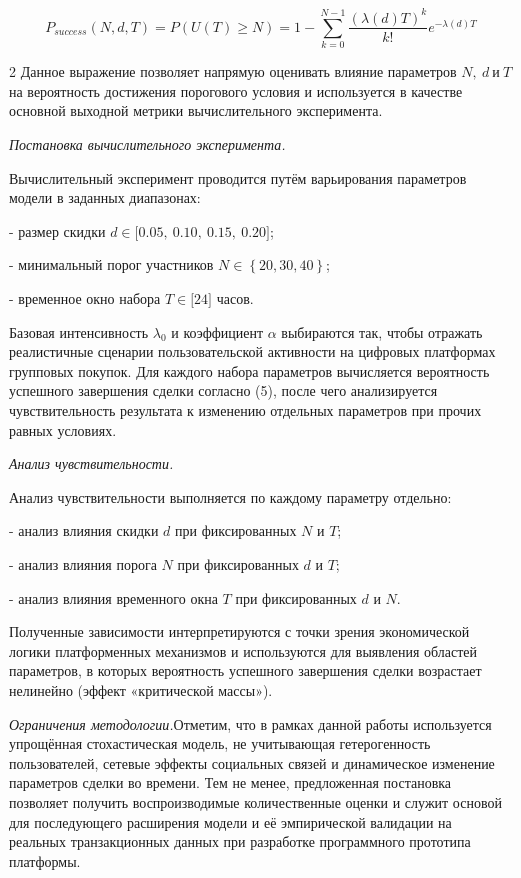 \vspace{-1.5em}
\begin{equation}
P_{success}(N,d,T) = P\left( U(T) \geq N \right) = 1 - \sum_{k = 0}^{N - 1}{\frac{{(\lambda(d)T)}^{k}}{k!}e^{- \lambda(d)T}}
\end{equation}
\vspace{-1.5em}
\begin{multicols}{2}
Данное выражение позволяет напрямую оценивать влияние параметров
\(N,\ d\ и\ T\) на вероятность достижения порогового условия и
используется в качестве основной выходной метрики вычислительного
эксперимента.

\emph{Постановка вычислительного эксперимента.}

Вычислительный эксперимент проводится путём варьирования параметров
модели в заданных диапазонах:

- размер скидки \(d \in \lbrack 0.05,\ 0.10,\ 0.15,\ 0.20\rbrack\);

- минимальный порог участников \(N \in \left\{ 20,30,40 \right\}\);

- временное окно набора \(T \in \lbrack 24\rbrack\) часов.

Базовая интенсивность \(\lambda_{0}\) и коэффициент \(\alpha\)
выбираются так, чтобы отражать реалистичные сценарии пользовательской
активности на цифровых платформах групповых покупок. Для каждого набора
параметров вычисляется вероятность успешного завершения сделки согласно
(5), после чего анализируется чувствительность результата к изменению
отдельных параметров при прочих равных условиях.

\emph{Анализ чувствительности.}

Анализ чувствительности выполняется по каждому параметру отдельно:

- анализ влияния скидки \(d\) при фиксированных \(N\) и \(T\);

- анализ влияния порога \(N\) при фиксированных \(d\) и \(T\);

- анализ влияния временного окна \(T\) при фиксированных \(d\) и \(N\).

Полученные зависимости интерпретируются с точки зрения экономической
логики платформенных механизмов и используются для выявления областей
параметров, в которых вероятность успешного завершения сделки возрастает
нелинейно (эффект «критической массы»).

\emph{Ограничения методологии.}Отметим, что в рамках данной работы
используется упрощённая стохастическая модель, не учитывающая
гетерогенность пользователей, сетевые эффекты социальных связей и
динамическое изменение параметров сделки во времени. Тем не менее,
предложенная постановка позволяет получить воспроизводимые
количественные оценки и служит основой для последующего расширения
модели и её эмпирической валидации на реальных транзакционных данных при
разработке программного прототипа платформы.


\end{multicols}
